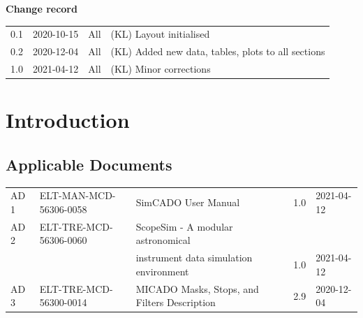 \documentclass[a4paper,twoside,11pt]{report}
\begin{document}

\dmdmaketitle


\begin{center}
  \textbf{Change record}

  \tabletail{\hline}

  \begin{supertabular}{|l|l|l|l|}
   0.1 & 2020-10-15 & All & (KL) Layout initialised \\
   0.2 & 2020-12-04 & All & (KL) Added new data, tables, plots to all sections \\
   1.0 & 2021-04-12 & All & (KL) Minor corrections \\
   \hline
  \end{supertabular}

\end{center}


\setcounter{tocdepth}{3}
\tableofcontents
\cleardoublepage


\chapter{Introduction}

\section{Applicable Documents}

\begin{center}
  \tabletail{\hline}

  \begin{supertabular}{|l|l|l|c|l|}
    AD\,1 & ELT-MAN-MCD-56306-0058 & SimCADO User Manual & 1.0 & 2021-04-12 \\
    AD\,2 & ELT-TRE-MCD-56306-0060 & ScopeSim - A modular astronomical & & \\
    & & instrument data simulation environment & 1.0 & 2021-04-12 \\
    AD\,3 & ELT-TRE-MCD-56300-0014 & MICADO Masks, Stops, and Filters Description & 2.9 & 2020-12-04 \\
  \end{supertabular}
\end{center}
\end{document}
